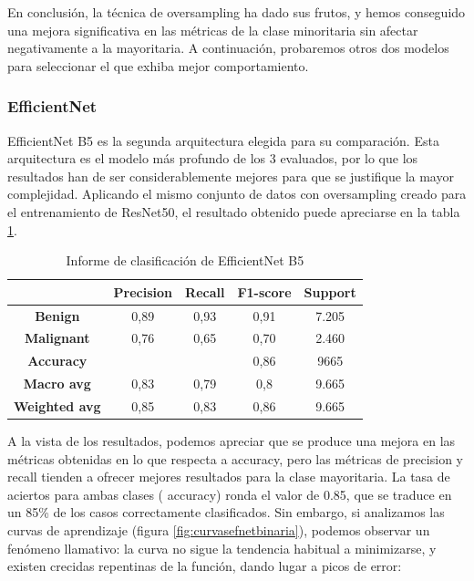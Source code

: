 En conclusión, la técnica de oversampling ha dado sus frutos, y hemos conseguido una mejora significativa en las métricas de la clase minoritaria sin afectar negativamente a la mayoritaria. A continuación, probaremos otros dos modelos para seleccionar el que exhiba mejor comportamiento.

\subsubsection{EfficientNet}

EfficientNet B5 es la segunda arquitectura elegida para su comparación. Esta arquitectura es el modelo más profundo de los 3 evaluados, por lo que los resultados han de ser considerablemente mejores para que se justifique la mayor complejidad. Aplicando el mismo conjunto de datos con oversampling creado para el entrenamiento de ResNet50, el resultado obtenido puede apreciarse en la tabla \ref{tab:resefnet}.

\begin{table}[H]
	\centering
	\begin{tabular}{|c|c|c|c|c|}
		\hline
		\textbf{} & \textbf{Precision} & \textbf{Recall} & \textbf{F1-score} & \textbf{Support} \\ \hline
		\textbf{Benign} & 0,89 & 0,93 & 0,91 & 7.205 \\ \hline
		\textbf{Malignant} & 0,76 & 0,65 & 0,70 & 2.460 \\ \hline
		\textbf{Accuracy} &  &  & 0,86 & 9665 \\ \hline
		\textbf{Macro avg} & 0,83& 0,79 & 0,8 & 9.665 \\ \hline
		\textbf{Weighted avg} & 0,85 & 0,83 & 0,86 & 9.665 \\ \hline
	\end{tabular}
	\caption{Informe de clasificación de EfficientNet B5}
	\label{tab:resefnet}
\end{table}

A la vista de los resultados, podemos apreciar que se produce una mejora en las métricas obtenidas en lo que respecta a accuracy, pero las métricas de precision y recall tienden a ofrecer mejores resultados para la clase mayoritaria. La tasa de aciertos para ambas clases ( accuracy) ronda el valor de 0.85, que se traduce en un 85\% de los casos correctamente clasificados.  Sin embargo, si analizamos las curvas de aprendizaje (figura \ref{fig:curvasefnetbinaria}), podemos observar un fenómeno llamativo: la curva no sigue la tendencia habitual a minimizarse, y existen crecidas repentinas de la función, dando lugar a picos de error:

